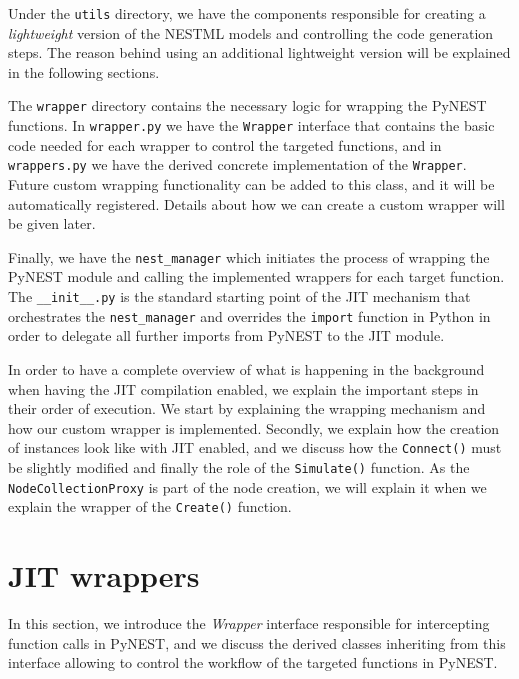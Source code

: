 \begin{figure}[ht!]
\end{figure}

Under the \texttt{utils} directory, we have the components responsible for creating a \emph{lightweight} version of the NESTML models and controlling the code generation steps. The reason behind using an additional lightweight version will be explained in the following sections.

The \texttt{wrapper} directory contains the necessary logic for wrapping the PyNEST functions. In \texttt{wrapper.py} we have the \texttt{Wrapper} interface that contains the basic code needed for each wrapper to control the targeted functions, and in \texttt{wrappers.py} we have the derived concrete implementation of the \texttt{Wrapper}. Future custom wrapping functionality can be added to this class, and it will be automatically registered. Details about how we can create a custom wrapper will be given later.

Finally, we have the \texttt{nest\_manager} which initiates the process of wrapping the PyNEST module and calling the implemented wrappers for each target function. The \texttt{\_\_init\_\_.py} is the standard starting point of the JIT mechanism that orchestrates the \texttt{nest\_manager} and overrides the \texttt{import} function in Python in order to delegate all further imports from PyNEST to the JIT module.

In order to have a complete overview of what is happening in the background when having the JIT compilation enabled, we explain the important steps in their order of execution. We start by explaining the wrapping mechanism and how our custom wrapper is implemented. Secondly, we explain how the creation of instances look like with JIT enabled, and we discuss how the \texttt{Connect()} must be slightly modified and finally the role of the \texttt{Simulate()} function. As the \texttt{NodeCollectionProxy} is part of the node creation, we will explain it when we explain the wrapper of the \texttt{Create()} function.

\section{JIT wrappers}

In this section, we introduce the \emph{Wrapper} interface responsible for intercepting function calls in PyNEST, and we discuss the derived classes inheriting from this interface allowing to control the workflow of the targeted functions in PyNEST.

